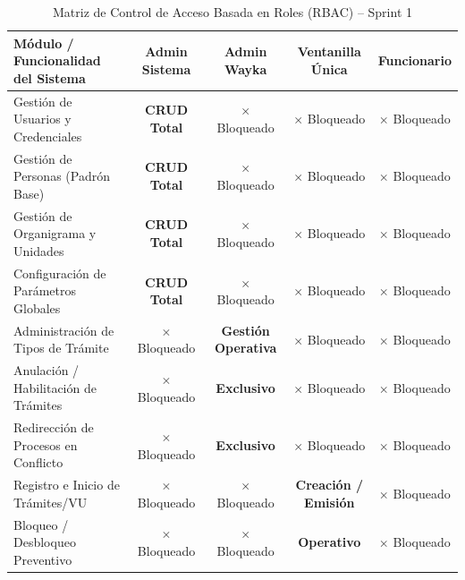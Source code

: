 \documentclass[a4paper,12pt]{article}
\begin{document}
\begin{table}[H]
\centering
\small
\caption{Matriz de Control de Acceso Basada en Roles (RBAC) -- Sprint 1}
\label{tab:rbac_matrix}
\begin{tabularx}{\linewidth}{@{}>{\raggedright\arraybackslash}p{4.7cm}*{4}{C}@{}}
\toprule
\textbf{Módulo / Funcionalidad del Sistema} & \textbf{Admin Sistema} & \textbf{Admin Wayka} & \textbf{Ventanilla Única} & \textbf{Funcionario} \\
\midrule
Gestión de Usuarios y Credenciales & \textbf{\color{colorExito}CRUD Total} & \color{colorAlerta}$\times$ Bloqueado & \color{colorAlerta}$\times$ Bloqueado & \color{colorAlerta}$\times$ Bloqueado \\
Gestión de Personas (Padrón Base) & \textbf{\color{colorExito}CRUD Total} & \color{colorAlerta}$\times$ Bloqueado & \color{colorAlerta}$\times$ Bloqueado & \color{colorAlerta}$\times$ Bloqueado \\
Gestión de Organigrama y Unidades & \textbf{\color{colorExito}CRUD Total} & \color{colorAlerta}$\times$ Bloqueado & \color{colorAlerta}$\times$ Bloqueado & \color{colorAlerta}$\times$ Bloqueado \\
Configuración de Parámetros Globales & \textbf{\color{colorExito}CRUD Total} & \color{colorAlerta}$\times$ Bloqueado & \color{colorAlerta}$\times$ Bloqueado & \color{colorAlerta}$\times$ Bloqueado \\
Administración de Tipos de Trámite & \color{colorAlerta}$\times$ Bloqueado & \textbf{\color{colorExito}Gestión Operativa} & \color{colorAlerta}$\times$ Bloqueado & \color{colorAlerta}$\times$ Bloqueado \\
Anulación / Habilitación de Trámites & \color{colorAlerta}$\times$ Bloqueado & \textbf{\color{colorExito}Exclusivo} & \color{colorAlerta}$\times$ Bloqueado & \color{colorAlerta}$\times$ Bloqueado \\
Redirección de Procesos en Conflicto & \color{colorAlerta}$\times$ Bloqueado & \textbf{\color{colorExito}Exclusivo} & \color{colorAlerta}$\times$ Bloqueado & \color{colorAlerta}$\times$ Bloqueado \\
Registro e Inicio de Trámites/VU & \color{colorAlerta}$\times$ Bloqueado & \color{colorAlerta}$\times$ Bloqueado & \textbf{\color{colorExito}Creación / Emisión} & \color{colorAlerta}$\times$ Bloqueado \\
Bloqueo / Desbloqueo Preventivo & \color{colorAlerta}$\times$ Bloqueado & \color{colorAlerta}$\times$ Bloqueado & \textbf{\color{colorExito}Operativo} & \color{colorAlerta}$\times$ Bloqueado \\

\end{tabularx}
\end{table}
\end{document}
